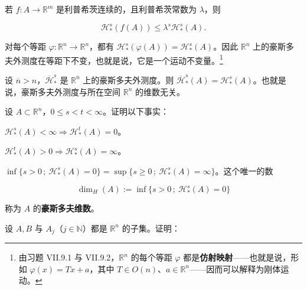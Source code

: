 \begin{exercises}
\begin{items}
\item

若 $ f\colon A \to \mathbb{R}^m $ 是利普希茨连续的，且利普希茨常数为 $ \lambda $，则

\[
\mathcal{H}_*^s(f(A)) \le \lambda^s \mathcal{H}_*^s(A) .
\]
\item

对每个等距 $ \varphi\colon \mathbb{R}^n \to \mathbb{R}^n $，都有 $ \mathcal{H}_*^s(\varphi(A)) = \mathcal{H}_*^s(A) $。因此 $ \mathbb{R}^n $ 上的豪斯多夫外测度在等距下不变，也就是说，它是一个运动不变量。\footnote{由习题 VII.9.1 与 VII.9.2，$ \mathbb{R}^n $ 的每个等距 $ \varphi $ 都是\textbf{仿射映射}——也就是说，形如 $ \varphi(x) = T x + a $，其中 $ T \in O(n) $、$ a \in \mathbb{R}^n $——因而可以解释为刚体运动。}

\item

设 $ \overline{n} > n $，$ \overline{\mathcal{H}}_*^s $ 是 $ \mathbb{R}^{\overline{n}} $ 上的豪斯多夫外测度。则 $ \overline{\mathcal{H}}_*^s(A) = \mathcal{H}_*^s(A) $。也就是说，豪斯多夫外测度与所在空间 $ \mathbb{R}^n $ 的维数无关。

\end{items}

\item

设 $ A \subset \mathbb{R}^n $，$ 0 \le s < t < \infty $。证明以下事实：

\begin{items}
\item

$ \mathcal{H}_*^s(A) < \infty \Rightarrow \mathcal{H}_*^t(A) = 0 $。

\item

$ \mathcal{H}_*^t(A) > 0 \Rightarrow \mathcal{H}_*^s(A) = \infty $。

\item

$ \inf\{ s > 0 \,;\ \mathcal{H}_*^s(A) = 0 \} = \sup\{ s \ge 0 \,;\ \mathcal{H}_*^s(A) = \infty \} $。这个唯一的数

\[
\dim_H(A) := \inf\{ s > 0 \,;\ \mathcal{H}_*^s(A) = 0 \}
\]

称为 $ A $ 的\textbf{豪斯多夫维数}。

\end{items}

\item

设 $ A, B $ 与 $ A_j $（$ j \in \mathbb{N} $）都是 $ \mathbb{R}^n $ 的子集。证明：


\end{exercises}
